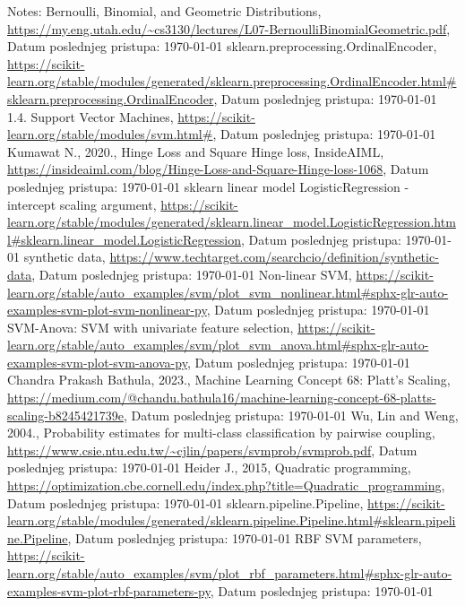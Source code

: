 \documentclass[fontsize=12bp, paper=a4]{scrarticle}
\begin{document}
\begin{thebibliography}{1}
    Notes: Bernoulli, Binomial, and Geometric Distributions, \url{https://my.eng.utah.edu/~cs3130/lectures/L07-BernoulliBinomialGeometric.pdf}, Datum poslednjeg pristupa: \today
    sklearn.preprocessing.OrdinalEncoder, \url{https://scikit-learn.org/stable/modules/generated/sklearn.preprocessing.OrdinalEncoder.html#sklearn.preprocessing.OrdinalEncoder}, Datum poslednjeg pristupa: \today
    1.4. Support Vector Machines, \url{https://scikit-learn.org/stable/modules/svm.html#}, Datum poslednjeg pristupa: \today
    Kumawat N., 2020., Hinge Loss and Square Hinge loss,  InsideAIML, \url{https://insideaiml.com/blog/Hinge-Loss-and-Square-Hinge-loss-1068}, Datum poslednjeg pristupa: \today
    \textmd{sklearn linear model LogisticRegression - intercept scaling argument}, \url{https://scikit-learn.org/stable/modules/generated/sklearn.linear_model.LogisticRegression.html#sklearn.linear_model.LogisticRegression}, Datum poslednjeg pristupa: \today
    synthetic data, \url{https://www.techtarget.com/searchcio/definition/synthetic-data}, Datum poslednjeg pristupa: \today
    Non-linear SVM, \url{https://scikit-learn.org/stable/auto_examples/svm/plot_svm_nonlinear.html#sphx-glr-auto-examples-svm-plot-svm-nonlinear-py}, Datum poslednjeg pristupa: \today
    SVM-Anova: SVM with univariate feature selection,
    \url{https://scikit-learn.org/stable/auto_examples/svm/plot_svm_anova.html#sphx-glr-auto-examples-svm-plot-svm-anova-py}, Datum poslednjeg pristupa: \today
    Chandra Prakash Bathula, 2023., Machine Learning Concept 68: Platt’s Scaling, \url{https://medium.com/@chandu.bathula16/machine-learning-concept-68-platts-scaling-b8245421739e}, Datum poslednjeg pristupa: \today
    Wu, Lin and Weng, 2004., Probability estimates for multi-class classification by pairwise coupling, \url{https://www.csie.ntu.edu.tw/~cjlin/papers/svmprob/svmprob.pdf}, Datum poslednjeg pristupa: \today
    Heider J., 2015, Quadratic programming, \url{https://optimization.cbe.cornell.edu/index.php?title=Quadratic_programming}, Datum poslednjeg pristupa: \today
    sklearn.pipeline.Pipeline, \url{ https://scikit-learn.org/stable/modules/generated/sklearn.pipeline.Pipeline.html#sklearn.pipeline.Pipeline}, Datum poslednjeg pristupa: \today
    RBF SVM parameters, \url{https://scikit-learn.org/stable/auto_examples/svm/plot_rbf_parameters.html#sphx-glr-auto-examples-svm-plot-rbf-parameters-py}, Datum poslednjeg pristupa: \today

\end{thebibliography}
\end{document}
